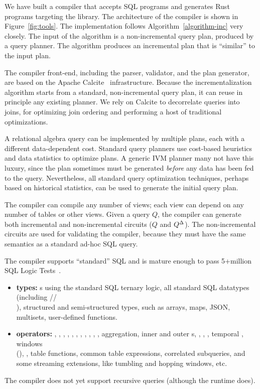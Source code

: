 We have built a compiler that accepts SQL programs and generates Rust
programs targeting the \dbsp library.  The architecture of the
compiler is shown in Figure~\ref{fig:tools}.  The implementation
follows Algorithm~\ref{algorithm-inc} very closely.  The input of the
algorithm is a non-incremental query plan, produced by a query
planner.  The algorithm produces an incremental plan that is
``similar'' to the input plan.

The compiler front-end, including the parser, validator, and the plan
generator, are based on the Apache Calcite~\cite{begoli-icmd18}
infrastructure.  Because the incrementalization algorithm starts from
a standard, non-incremental query plan, it can reuse in principle any
existing planner.  We rely on Calcite to decorrelate queries into
joins, for optimizing join ordering and performing a host of
traditional optimizations.

A relational algebra query can be implemented by multiple plans, each
with a different data-dependent cost.  Standard query planners use
cost-based heuristics and data statistics to optimize plans.  A
generic IVM planner many not have this luxury, since the plan
sometimes must be generated \emph{before} any data has been fed to the
query.  Nevertheless, all standard query optimization techniques,
perhaps based on historical statistics, can be used to generate the
initial query plan.

The compiler can compile any number of views; each view can depend on
any number of tables or other views.  Given a query $Q$, the compiler
can generate both incremental and non-incremental circuits ($Q$ and
${Q}^{\Delta}$).  The non-incremental circuits are used for validating the
compiler, because they must have the same semantics as a standard
ad-hoc SQL query.

The compiler supports ``standard'' SQL and is mature enough to pass
5+million SQL Logic Tests~\cite{sqllogictest}.
\begin{itemize}
\item \textbf{types:} s using the standard SQL ternary
  logic, all standard SQL datatypes (including
  //\\), structured and
  semi-structured types, such as arrays, maps, JSON, multisets,
  user-defined functions.
\item \textbf{operators:} , , ,
  ,  , ,
  , , , ,
  , aggregation, inner and outer s,
  , , , temporal ,
  windows \\ (), , table
  functions, common table expressions, correlated subqueries, and some
  streaming extensions, like tumbling and hopping windows, etc.
\end{itemize}
The compiler does not yet support recursive queries (although the
runtime does).

